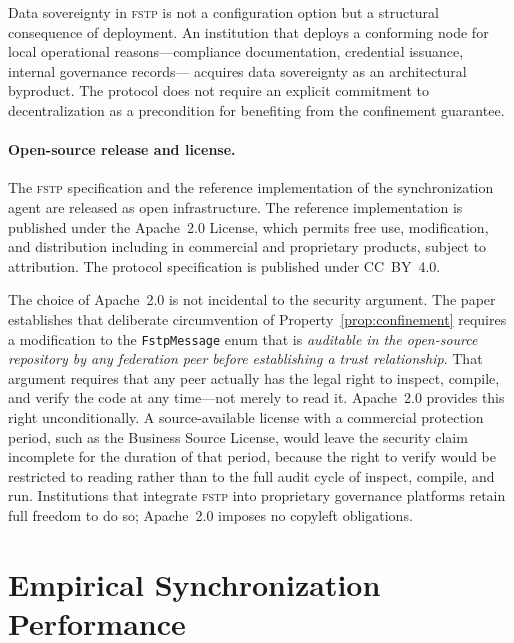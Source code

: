 \documentclass[12pt]{article}
\newcommand{\FSTP}{\textsc{fstp}}
\begin{document}
	Data sovereignty in \FSTP{} is not a configuration option but a
	structural consequence of deployment. An institution that deploys a
	conforming node for local operational reasons---compliance
	documentation, credential issuance, internal governance records---
	acquires data sovereignty as an architectural byproduct. The protocol
	does not require an explicit commitment to decentralization as a
	precondition for benefiting from the confinement guarantee.
	
	\paragraph{Open-source release and license.}
	
	The \FSTP{} specification and the reference implementation of the
	synchronization agent are released as open infrastructure. The
	reference implementation is published under the Apache~2.0 License,
	which permits free use, modification, and distribution including in
	commercial and proprietary products, subject to attribution. The
	protocol specification is published under CC~BY~4.0.
	
	The choice of Apache~2.0 is not incidental to the security argument.
	The paper establishes that deliberate circumvention of
	Property~\ref{prop:confinement} requires a modification to the
	\texttt{FstpMessage} enum that is \emph{auditable in the open-source
		repository by any federation peer before establishing a trust
		relationship}. That argument requires that any peer actually has the
	legal right to inspect, compile, and verify the code at any time---not
	merely to read it. Apache~2.0 provides this right unconditionally. A
	source-available license with a commercial protection period, such as
	the Business Source License, would leave the security claim incomplete
	for the duration of that period, because the right to verify would be
	restricted to reading rather than to the full audit cycle of inspect,
	compile, and run. Institutions that integrate \FSTP{} into proprietary
	governance platforms retain full freedom to do so; Apache~2.0 imposes
	no copyleft obligations.
	
	
	\section{Empirical Synchronization Performance}
	\label{sec:benchmarks}
	
\end{document}
